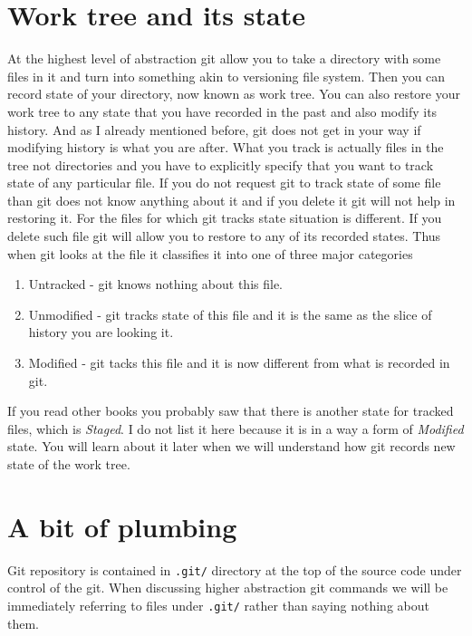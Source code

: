 \documentclass{article}
\theoremstyle{definition}
\begin{document}
        \newpage
        \section{Work tree and its state}
        At the highest level of abstraction git allow you to take a directory with some files in it and turn into
        something akin to versioning file system. Then you can record state of your directory, now known as work tree.
        You can also restore your work tree to any state that you have recorded in the past and also modify its
        history. And as I already mentioned before, git does not get in your way if modifying history is what you are
        after. What you track is actually files in the tree not directories and you have to explicitly specify that you
        want to track state of any particular file. If you do not request git to track state of some file than git does
        not know anything about it and if you delete it git will not help in restoring it. For the files for which git
        tracks state situation is different. If you delete such file git will allow you to restore to any of its
        recorded states. Thus when git looks at the file it classifies it into one of three major categories
        \begin{enumerate}
                \item Untracked - git knows nothing about this file.
                \item Unmodified - git tracks state of this file and it is the same as the slice of history you are looking it.
                \item Modified - git tacks this file and it is now different from what is recorded in git.
        \end{enumerate}
        If you read other books you probably saw that there is another state for tracked files, which is {\em Staged}.
        I do not list it here because it is in a way a form of {\em Modified} state. You will learn about it later when
        we will understand how git records new state of the work tree.

        \section{A bit of plumbing}
        Git repository is contained in \texttt{.git/} directory at the top of the source code under control of the git. When
        discussing higher abstraction git commands we will be immediately referring to files under \texttt{.git/} rather
        than saying nothing about them.
\end{document}
